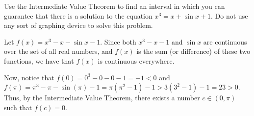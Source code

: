 \documentclass[handout,nooutcomes]{ximera}
\begin{document}
\begin{problem}
Use the Intermediate Value Theorem to find an interval in which you can guarantee that there is a solution to the equation $x^3 = x + \sin x + 1$.  Do not use any sort of graphing device to solve this problem.
	
	\begin{freeResponse}
	
	Let $f(x) = x^3 - x - \sin x - 1$.  Since both $x^3 - x - 1$ and $\sin x$ are continuous over the set of all real numbers, and $f(x)$ is the sum (or difference) of these two functions, we have that $f(x)$ is continuous everywhere.  
	
	Now, notice that $f(0) = 0^3 - 0 - 0 - 1 = -1 < 0$ and $f(\pi) = \pi^3 - \pi - \sin(\pi) - 1 = \pi(\pi^2 - 1) - 1 > 3(3^2 - 1) - 1 = 23 > 0$.  Thus, by the Intermediate Value Theorem, there exists a number $c \in (0, \pi)$ such that $f(c) = 0$.  
	
	\end{freeResponse}
\end{problem}
	










								
				
				
	
\end{document}
